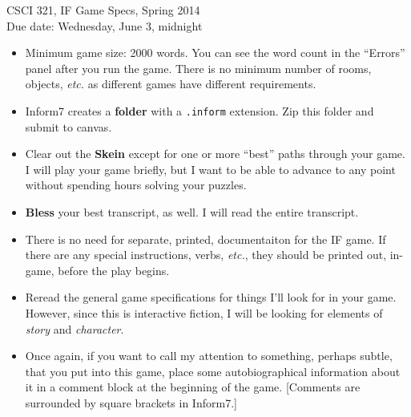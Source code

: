 \documentclass{article}
\begin{document}
\begin{description}
\item[CSCI 321, IF Game Specs, Spring 2014]

\item[Due date: Wednesday, June 3, midnight]
\end{description}


\begin{itemize}
\item 
Minimum game size:  2000 words.  You can see the word count in the
``Errors'' panel after you run the game.  There is no minimum number
of rooms, objects, {\em etc.} as different games have different
requirements. 
\item
Inform7 creates a {\bf folder} with a {\tt .inform} extension.  Zip
this folder and submit to canvas.
\item
Clear out the {\bf Skein} except for one or more ``best'' paths through
your game.  I will play your game briefly, but I want to be able to
advance to any point without spending hours solving your puzzles.
\item
{\bf Bless} your best transcript, as well.  I will read the entire
transcript. 
\item There is no need for separate, printed, documentaiton for the IF
  game.  If there are any special instructions, verbs, {\em etc.},
  they should be printed out, in-game, before the play begins.
\item
Reread the general game specifications for things I'll look for in
your game.  However, since this is interactive fiction, I will be
looking for elements of {\em story} and {\em character}.
\item
Once again, if you want to call my attention to something, perhaps
subtle, that you put into this game, place some autobiographical
information about it in a comment block at the beginning of the game.
[Comments are surrounded by square brackets in Inform7.]
\end{itemize}
\end{document}
